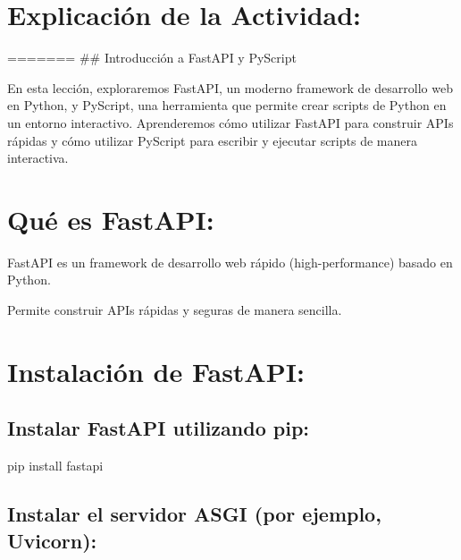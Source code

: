 \documentclass[
  a4paper,
  DIV=11,
  numbers=noendperiod,
  onepage,
  openany]{scrreprt}
\newenvironment{Shaded}{\begin{snugshade}}{\end{snugshade}}
\newcommand{\ExtensionTok}[1]{\textcolor[rgb]{0.00,0.23,0.31}{#1}}
\newcommand{\NormalTok}[1]{\textcolor[rgb]{0.00,0.23,0.31}{#1}}
\begin{document}
\hypertarget{explicaciuxf3n-de-la-actividad-82}{%
\section{Explicación de la
Actividad:}\label{explicaciuxf3n-de-la-actividad-82}}

======= \#\# Introducción a FastAPI y PyScript

En esta lección, exploraremos FastAPI, un moderno framework de
desarrollo web en Python, y PyScript, una herramienta que permite crear
scripts de Python en un entorno interactivo. Aprenderemos cómo utilizar
FastAPI para construir APIs rápidas y cómo utilizar PyScript para
escribir y ejecutar scripts de manera interactiva.

\hypertarget{quuxe9-es-fastapi-1}{%
\section{Qué es FastAPI:}\label{quuxe9-es-fastapi-1}}

FastAPI es un framework de desarrollo web rápido (high-performance)
basado en Python.

Permite construir APIs rápidas y seguras de manera sencilla.

\hypertarget{instalaciuxf3n-de-fastapi-1}{%
\section{Instalación de FastAPI:}\label{instalaciuxf3n-de-fastapi-1}}

\hypertarget{instalar-fastapi-utilizando-pip-1}{%
\subsection{Instalar FastAPI utilizando
pip:}\label{instalar-fastapi-utilizando-pip-1}}

\begin{Shaded}
\begin{Highlighting}[]
\ExtensionTok{pip}\NormalTok{ install fastapi}
\end{Highlighting}
\end{Shaded}

\hypertarget{instalar-el-servidor-asgi-por-ejemplo-uvicorn-1}{%
\subsection{Instalar el servidor ASGI (por ejemplo,
Uvicorn):}\label{instalar-el-servidor-asgi-por-ejemplo-uvicorn-1}}
\end{document}

